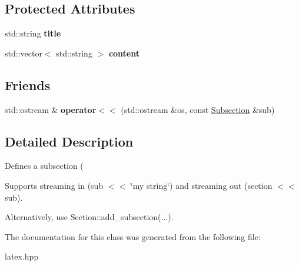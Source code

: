 \subsection*{Protected Attributes}
\begin{DoxyCompactItemize}
\item 
\hypertarget{classlatex_1_1doc_1_1Subsection_a8d54abcb5a9364cf63e9279b40cfcbf6}{std\-::string {\bfseries title}}\label{classlatex_1_1doc_1_1Subsection_a8d54abcb5a9364cf63e9279b40cfcbf6}

\item 
\hypertarget{classlatex_1_1doc_1_1Subsection_a6d79b427fd95a046a292184777212a3f}{std\-::vector$<$ std\-::string $>$ {\bfseries content}}\label{classlatex_1_1doc_1_1Subsection_a6d79b427fd95a046a292184777212a3f}

\end{DoxyCompactItemize}
\subsection*{Friends}
\begin{DoxyCompactItemize}
\item 
\hypertarget{classlatex_1_1doc_1_1Subsection_a6fae88d1537df6d93767459f4c918fe2}{std\-::ostream \& {\bfseries operator$<$$<$} (std\-::ostream \&os, const \hyperlink{classlatex_1_1doc_1_1Subsection}{Subsection} \&sub)}\label{classlatex_1_1doc_1_1Subsection_a6fae88d1537df6d93767459f4c918fe2}

\end{DoxyCompactItemize}


\subsection{Detailed Description}
Defines a subsection (

Supports streaming in (sub $<$$<$ \char`\"{}my string\char`\"{}) and streaming out (section $<$$<$ sub).

Alternatively, use {\ttfamily Section\-::add\-\_\-subsection(...)}. 

The documentation for this class was generated from the following file\-:\begin{DoxyCompactItemize}
\item 
latex.\-hpp\end{DoxyCompactItemize}
